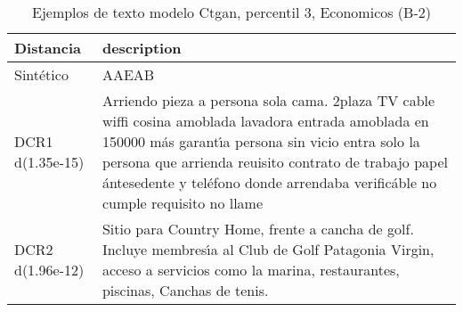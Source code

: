 \begin{table}[H]
\centering
\fontsize{10}{14}\selectfont
\caption{Ejemplos de texto modelo Ctgan, percentil 3, Economicos (B-2)}
\label{table-example-economicos-b-2-ctgan-3p-text}
\begin{tabular}{|l|m{35em}|}
\hline
\rowcolor[gray]{0.8}
Distancia & description \\
\hline Sintético & AAEAB \\
\hline DCR1 d(1.35e-15) & Arriendo pieza a persona sola  cama. 2plaza  TV cable  wiffi cosina amoblada lavadora entrada amoblada en 150000 m\'as garant{\'\i}a persona sin vicio entra solo la persona que arrienda  reuisito  contrato de trabajo papel \'antesedente y tel\'efono donde  arrendaba  verific\'able  no cumple requisito no llame \\
\hline DCR2 d(1.96e-12) & Sitio para Country Home, frente a cancha de golf. Incluye membres{\'\i}a al Club de Golf Patagonia Virgin, acceso a servicios como la marina, restaurantes, piscinas, Canchas de tenis. \\
\hline
\end{tabular}
\end{table}
